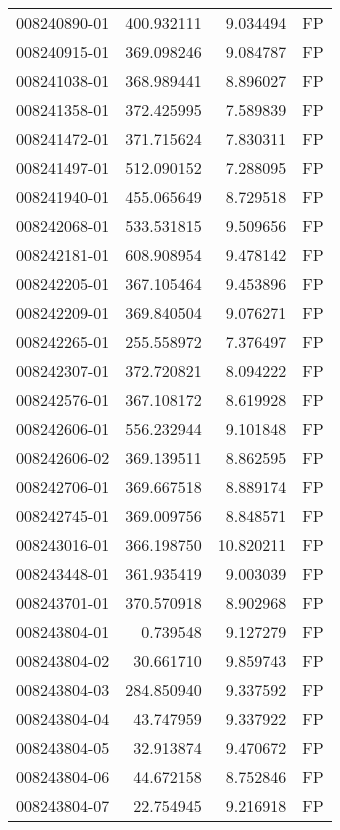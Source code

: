 \begin{tabular}{lrrl}
008240890-01 &  400.932111 &       9.034494 &   FP \\
008240915-01 &  369.098246 &       9.084787 &   FP \\
008241038-01 &  368.989441 &       8.896027 &   FP \\
008241358-01 &  372.425995 &       7.589839 &   FP \\
008241472-01 &  371.715624 &       7.830311 &   FP \\
008241497-01 &  512.090152 &       7.288095 &   FP \\
008241940-01 &  455.065649 &       8.729518 &   FP \\
008242068-01 &  533.531815 &       9.509656 &   FP \\
008242181-01 &  608.908954 &       9.478142 &   FP \\
008242205-01 &  367.105464 &       9.453896 &   FP \\
008242209-01 &  369.840504 &       9.076271 &   FP \\
008242265-01 &  255.558972 &       7.376497 &   FP \\
008242307-01 &  372.720821 &       8.094222 &   FP \\
008242576-01 &  367.108172 &       8.619928 &   FP \\
008242606-01 &  556.232944 &       9.101848 &   FP \\
008242606-02 &  369.139511 &       8.862595 &   FP \\
008242706-01 &  369.667518 &       8.889174 &   FP \\
008242745-01 &  369.009756 &       8.848571 &   FP \\
008243016-01 &  366.198750 &      10.820211 &   FP \\
008243448-01 &  361.935419 &       9.003039 &   FP \\
008243701-01 &  370.570918 &       8.902968 &   FP \\
008243804-01 &    0.739548 &       9.127279 &   FP \\
008243804-02 &   30.661710 &       9.859743 &   FP \\
008243804-03 &  284.850940 &       9.337592 &   FP \\
008243804-04 &   43.747959 &       9.337922 &   FP \\
008243804-05 &   32.913874 &       9.470672 &   FP \\
008243804-06 &   44.672158 &       8.752846 &   FP \\
008243804-07 &   22.754945 &       9.216918 &   FP \\

\end{tabular}
